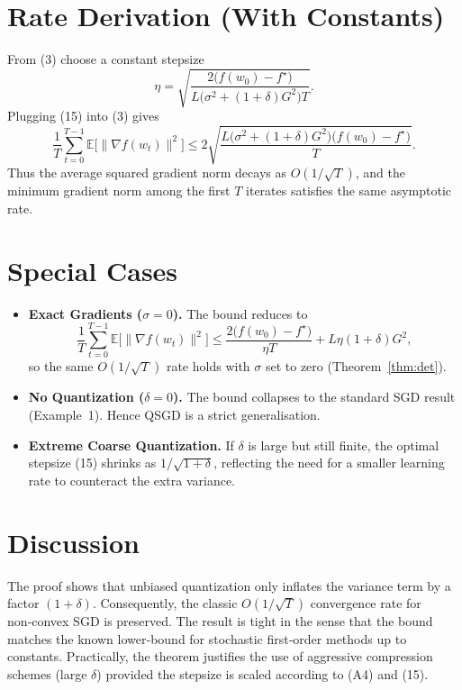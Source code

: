 \documentclass{article}
\begin{document}
\section*{Rate Derivation (With Constants)}
From (3) choose a constant stepsize
\[
\eta = \sqrt{\frac{2\big(f(w_0)-f^\star\big)}{L\big(\sigma^2+(1+\delta)G^2\big)T}}.
\tag{15}
\]
Plugging (15) into (3) gives
\[
\frac{1}{T}\sum_{t=0}^{T-1}\mathbb{E}\!\big[\|\nabla f(w_t)\|^2\big]
\le
2\sqrt{\frac{L\big(\sigma^2+(1+\delta)G^2\big)
\big(f(w_0)-f^\star\big)}{T}}.
\tag{16}
\]
Thus the average squared gradient norm decays as $O(1/\sqrt{T})$, and the
minimum gradient norm among the first $T$ iterates satisfies the same
asymptotic rate.

\section*{Special Cases}
\begin{itemize}
\item \textbf{Exact Gradients ($\sigma=0$).}  The bound reduces to
\[
\frac{1}{T}\sum_{t=0}^{T-1}\mathbb{E}\!\big[\|\nabla f(w_t)\|^2\big]
\le
\frac{2\big(f(w_0)-f^\star\big)}{\eta T}
+L\eta(1+\delta)G^2,
\]
so the same $O(1/\sqrt{T})$ rate holds with $\sigma$ set to zero
(Theorem~\ref{thm:det}).

\item \textbf{No Quantization ($\delta=0$).}  The bound collapses to the
standard SGD result (Example~1).  Hence QSGD is a strict generalisation.

\item \textbf{Extreme Coarse Quantization.}
If $\delta$ is large but still finite, the optimal stepsize (15) shrinks as
$1/\sqrt{1+\delta}$, reflecting the need for a smaller learning rate to
counteract the extra variance.
\end{itemize}

\section*{Discussion}
The proof shows that unbiased quantization only inflates the variance term
by a factor $(1+\delta)$.  Consequently, the classic $O(1/\sqrt{T})$ convergence
rate for non‑convex SGD is preserved.  The result is tight in the sense that
the bound matches the known lower‑bound for stochastic first‑order methods up
to constants.  Practically, the theorem justifies the use of aggressive
compression schemes (large $\delta$) provided the stepsize is scaled according
to (A4) and (15).
\end{document}
